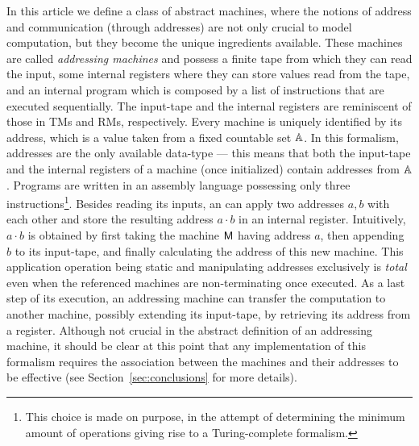In this article we define a class of abstract machines, where the notions of  address and communication (through addresses) are not only crucial to model computation, but they become the unique ingredients available.
These machines are called \emph{addressing machines} and possess a finite tape from which they can read the input, some internal registers where they can store values read from the tape, and an internal program which is composed by a  list of instructions that are executed sequentially.
The input-tape and the internal registers are reminiscent of those in TMs and RMs, respectively.
Every machine is uniquely identified by its address, which is a value taken from a fixed countable set $\mathbb{A}$. In this formalism, addresses are the only available data-type --- this means that both the input-tape and the internal registers of a machine (once initialized) contain addresses from $\mathbb{A}$.
Programs are written in an assembly language possessing only three instructions\footnote{This choice is made on purpose, in the attempt of determining the minimum amount of operations giving rise to a Turing-complete formalism.}.
Besides reading its inputs, an \am{} can apply two addresses $a,b$ with each other and store the resulting address $a\cdot b$ in an internal register.
Intuitively, $a\cdot b$ is obtained by first taking the machine $\mathsf{M}$ having address $a$, then appending $b$ to its input-tape, and finally calculating the address of this new machine.
This application operation being static and manipulating addresses exclusively is \emph{total} even when the referenced machines are non-terminating once executed.
As a last step of its execution, an addressing machine can transfer the computation to another machine, possibly extending its input-tape, by retrieving its address from a register.
Although not crucial in the abstract definition of an addressing machine, it should be clear at this point that any implementation of this formalism requires the association between the machines and their addresses to be effective (see Section~\ref{sec:conclusions} for more details).



